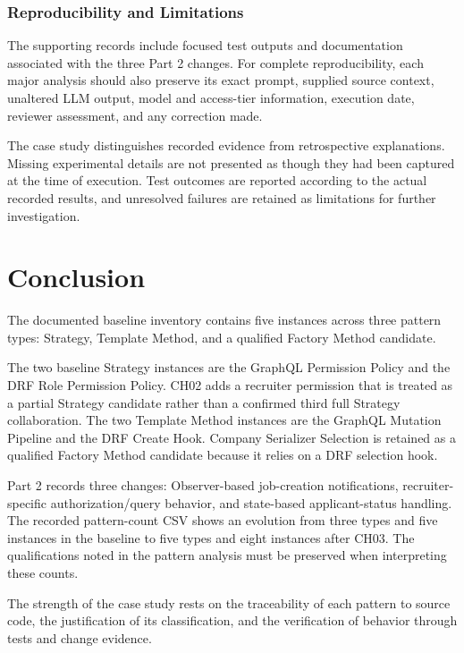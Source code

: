 \documentclass[11pt,a4paper]{article}
\begin{document}
\subsubsection{Reproducibility and Limitations}

The supporting records include focused test outputs and
documentation associated with the three Part 2 changes.
For complete reproducibility, each major analysis should
also preserve its exact prompt, supplied source context,
unaltered LLM output, model and access-tier information,
execution date, reviewer assessment, and any correction made.

The case study distinguishes recorded evidence from
retrospective explanations. Missing experimental details
are not presented as though they had been captured at the
time of execution. Test outcomes are reported according to
the actual recorded results, and unresolved failures are
retained as limitations for further investigation.

\section{Conclusion}

The documented baseline inventory contains five instances
across three pattern types: Strategy, Template Method, and
a qualified Factory Method candidate.

The two baseline Strategy instances are the GraphQL Permission Policy
and the DRF Role Permission Policy. CH02 adds a recruiter permission
that is treated as a partial Strategy candidate rather than a confirmed
third full Strategy collaboration. The two Template Method
instances are the GraphQL Mutation Pipeline and the DRF
Create Hook. Company Serializer Selection is retained as
a qualified Factory Method candidate because it relies on
a DRF selection hook.

Part 2 records three changes: Observer-based job-creation
notifications, recruiter-specific authorization/query
behavior, and state-based applicant-status handling. The
recorded pattern-count CSV shows an evolution from three
types and five instances in the baseline to five types and
eight instances after CH03. The qualifications noted in
the pattern analysis must be preserved when interpreting
these counts.

The strength of the case study rests on the traceability
of each pattern to source code, the justification of its
classification, and the verification of behavior through
tests and change evidence.
\end{document}
